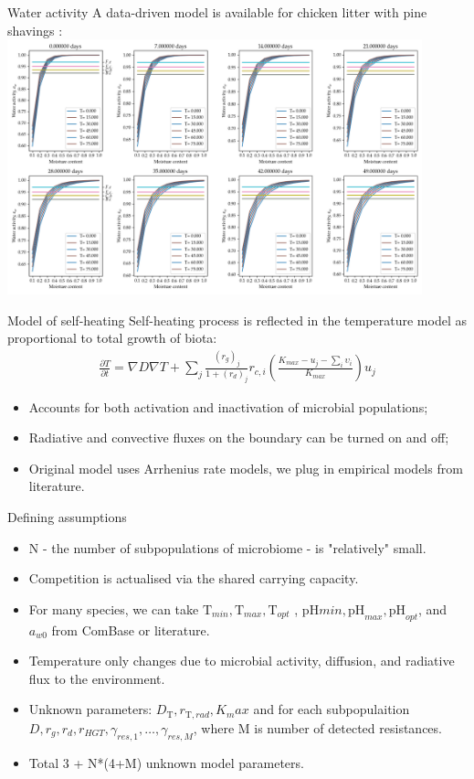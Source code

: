 \documentclass[mathserif,11pt]{beamer}
\begin{document}
\begin{frame}{Water activity}
	A data-driven model is available for chicken litter with pine shavings \cite{Hendriks2014}:\\
	\centering
	\includegraphics[width=0.9\textwidth]{Figures/aw_vs_moisture}
\end{frame}
\begin{frame}{Model of self-heating}
Self-heating process is reflected in the temperature model as proportional to total growth of biota:
	\begin{align*}
\frac{\partial T}{ \partial t} = \nabla D \nabla T +
 \sum_j \frac{(r_g)_j}{1 + (r_d)_j}r_{c,i} \left(\frac{K_{max} - u_j - \sum_i \upsilon_i}{K_{max}} \right) u_j 
\end{align*}
\begin{itemize}
	\item Accounts for both activation and inactivation of microbial populations;
	\item Radiative and convective fluxes on the boundary can be turned on and off;
	\item Original model uses Arrhenius rate models, we plug in empirical models from literature.
\end{itemize}
\end{frame}
\begin{frame}{Defining assumptions}
\begin{itemize}
	\item N - the number of subpopulations of microbiome - is "relatively" small.
	\item Competition is actualised via the shared carrying capacity.
	\item For many species, we can take $\mathrm{T}_{min}, \mathrm{T}_{max}, \mathrm{T}_{opt}$ , $\mathrm{pH}{min}, \mathrm{pH}_{max}, \mathrm{pH}_{opt}$, and $a_{w0}$ from ComBase or literature.
	\item Temperature only changes due to microbial activity, diffusion, and radiative flux to the environment.
	\item Unknown parameters: $D_{\mathrm{T}}, r_{\mathrm{T},rad}, K_max$ and for each subpopulaition $D, r_g, r_d, r_{HGT}, \gamma_{res,1}, \dots, \gamma_{res,M}$, where M is number of detected resistances.
	\item Total 3 + N*(4+M) unknown model parameters. 
\end{itemize}
\end{frame}
\end{document}
